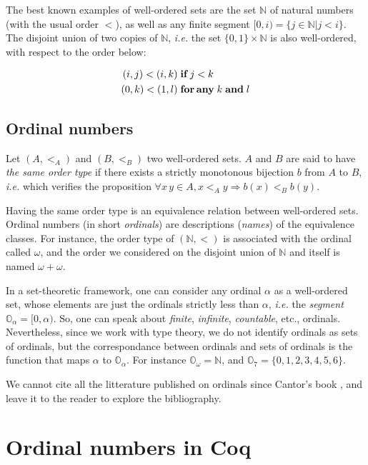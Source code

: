 The best known examples of well-ordered sets are the set $\mathbb{N}$ of natural numbers (with the usual order $<$), as well as any finite segment $[0,i)=\{j\in\mathbb{N}|j<i\}$.
The disjoint union of two copies of $\mathbb{N}$, \emph{i.e.} the set $\{0,1\}\times\mathbb{N}$ is also well-ordered,
with respect to the order below:

\begin{align*}
(i,j) < (i,k) & \;\textbf{if} \; j < k\\
(0,k) < (1,l) & \;\textbf{for\,any}\;k \;\textbf{and} \; l
\end{align*}

\subsection{Ordinal numbers}


Let $(A,<_A)$ and $(B,<_B)$ two well-ordered sets. $A$ and $B$ are said to have \emph{the same order type} if 
there exists a strictly monotonous bijection $b$ from $A$ to $B$, \emph{i.e.} which verifies the proposition
$\forall x\,y\in A, x <_A y \Rightarrow b(x) <_B  b(y)$.

Having the same order type is an equivalence relation between well-ordered sets. Ordinal numbers (in short \emph{ordinals}) are descriptions (\emph{names}) of the equivalence classes.
For instance, the order type of $(\mathbb{N},<)$ is associated with the ordinal called  $\omega$, and the order we considered on 
the disjoint union of $\mathbb{N}$ and itself is named $\omega+\omega$.

In a set-theoretic framework, one can consider any ordinal $\alpha$ as a well-ordered set, whose  elements are just the ordinals strictly less than $\alpha$, \emph{i.e.} the \emph{segment} $\mathbb{O}_\alpha=[0, \alpha)$. So, one can speak about \emph{finite}, \emph{infinite}, \emph{countable}, etc., ordinals. Nevertheless, since we work with type theory, 
we do not identify ordinals as sets of ordinals, but the correspondance between ordinals and sets of ordinals is the function that maps $\alpha$ to $\mathbb{O}_\alpha$.
For instance $\mathbb{O}_\omega=\mathbb{N}$, and $\mathbb{O}_7=\{0,1,2,3,4,5,6\}$.


We cannot cite all the litterature published on ordinals since Cantor's book 
\cite{cantorbook}, and 
leave it to the reader to explore the bibliography. 


\section{Ordinal numbers in Coq}

